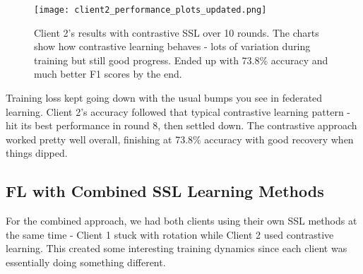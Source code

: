\documentclass[a4paper, 10 pt, conference]{ieeeconf}
\begin{document}
\begin{figure*}[!htbp]
\centering
\texttt{[image: client2\_performance\_plots\_updated.png]}
\caption{Client 2's results with contrastive SSL over 10 rounds. The charts show how contrastive learning behaves - lots of variation during training but still good progress. Ended up with 73.8\% accuracy and much better F1 scores by the end.}
\label{fig:client2_performance}
\end{figure*}

Training loss kept going down with the usual bumps you see in federated learning. Client 2's accuracy followed that typical contrastive learning pattern - hit its best performance in round 8, then settled down. The contrastive approach worked pretty well overall, finishing at 73.8\% accuracy with good recovery when things dipped.

\subsection{FL with Combined SSL Learning Methods}

For the combined approach, we had both clients using their own SSL methods at the same time - Client 1 stuck with rotation while Client 2 used contrastive learning. This created some interesting training dynamics since each client was essentially doing something different.
\end{document}

